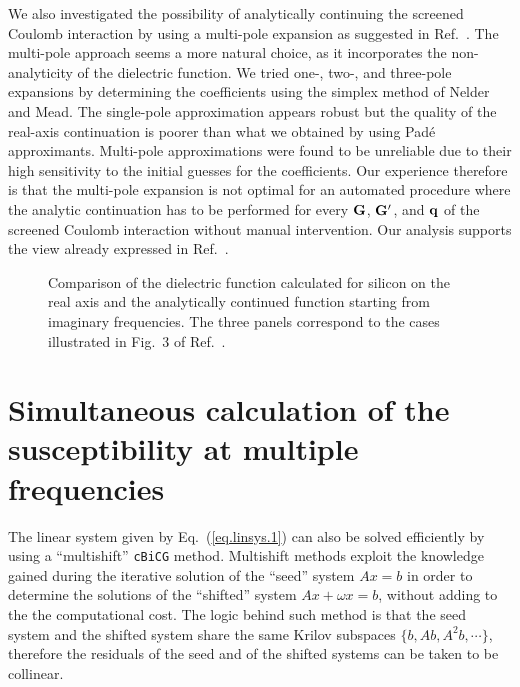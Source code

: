 \documentclass[twocolumn,prb,showpacs,superscriptaddress]{revtex4}
\def\w{\omega}
\def\q{{\bf q}}
\def\G{{\bf G}}
\def\Gp{{\bf G^\prime}}
\begin{document}
We also investigated the possibility of analytically continuing
the screened Coulomb interaction by using a multi-pole expansion
as suggested in Ref.\ . The multi-pole approach
seems a more natural choice, as it incorporates the non-analyticity
of the dielectric function. We tried one-, two-, and three-pole
expansions by determining the coefficients using the simplex 
method of Nelder and Mead.\cite{nelder-mead}
The single-pole approximation appears robust but the quality
of the real-axis continuation is poorer than what we obtained
by using Pad\'e approximants. Multi-pole approximations were found
to be unreliable due to their high sensitivity to the initial guesses 
for the coefficients.
Our experience therefore is that the multi-pole expansion is not optimal 
for an automated procedure where the analytic continuation has to be
performed for every $\G$, $\Gp$, and $\q$ of the screened Coulomb 
interaction without manual intervention. Our analysis supports the view 
already expressed in Ref.\ .

\begin  {figure}
\begin  {center}
\end    {center}
\caption{\label{fig.pade}
        Comparison of the dielectric function calculated for silicon 
        on the real axis and the analytically continued function starting
        from imaginary frequencies. The three panels correspond to the
        cases illustrated in Fig.\ 3 of Ref.\ .
        }
\end    {figure}

\section{Simultaneous calculation of the susceptibility at multiple frequencies}

The linear system given by Eq.\ (\ref{eq.linsys.1}) 
can also be solved efficiently by using a ``multishift'' 
{\tt cBiCG} method.\cite{frommer} 
Multishift methods exploit the knowledge gained during the iterative
solution of the ``seed'' system $Ax=b$ in order to determine the solutions 
of the ``shifted'' system $Ax+\w x=b$, without adding to the the computational 
cost. The logic behind such method is that the seed system and the
shifted system share the same Krilov subspaces $\{b,Ab,A^2b,\cdots\}$,
therefore the residuals of the seed and of the shifted
systems can be taken to be collinear.\cite{frommer}
\end{document}
